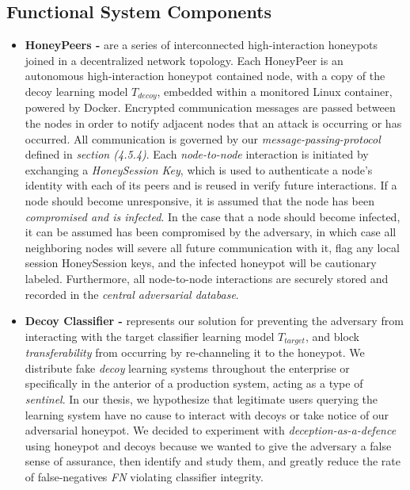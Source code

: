 \documentclass[grad,lot,lof,11pt,oneside,onehalfspace]{RUthesis}
\begin{document}
\subsection{Functional System Components}
\begin{itemize}
	\item \textbf{HoneyPeers -} are a series of interconnected high-interaction honeypots joined in a decentralized network topology. Each HoneyPeer is an autonomous high-interaction honeypot contained node, with a copy of the decoy learning model \textit{$T_{decoy}$}, embedded within a monitored Linux container, powered by Docker. Encrypted communication messages are passed between the nodes in order to notify adjacent nodes that an attack is occurring or has occurred. All communication is governed by our \textit{message-passing-protocol} defined in \textit{section (4.5.4)}. Each \textit{node-to-node} interaction is initiated by exchanging a \textit{HoneySession Key}, which is used to authenticate a node's identity with each of its peers and is reused in verify future interactions. If a node should become unresponsive, it is assumed that the node has been \textit{compromised and is infected}. In the case that a node should become infected, it can be assumed has been compromised by the adversary, in which case all neighboring nodes will severe all future communication with it, flag any local session HoneySession keys, and the infected honeypot will be cautionary labeled. Furthermore, all node-to-node interactions are securely stored and recorded in the \textit{central adversarial database}. 
	\item \textbf{Decoy Classifier -} represents our solution for preventing the adversary from interacting with the target classifier learning model \textit{$T_{target}$}, and block \textit{transferability} from occurring by re-channeling it to the honeypot. We distribute fake \textit{decoy} learning systems throughout the enterprise or specifically in the anterior of a production system, acting as a type of \textit{sentinel}. In our thesis, we hypothesize that  legitimate users querying the learning system have no cause to interact with decoys or take notice of our adversarial honeypot. We decided to experiment with \textit{deception-as-a-defence} using honeypot and decoys because we wanted to give the adversary a false sense of assurance, then identify and study them, and greatly reduce the rate of false-negatives \textit{FN} violating classifier integrity.
	

\end{itemize}
\end{document}
